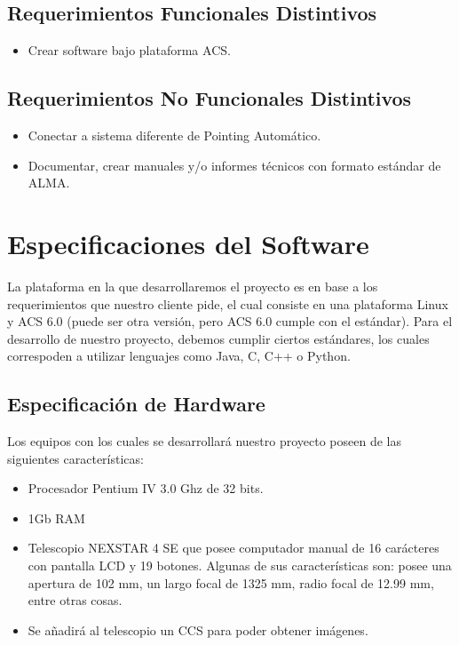 \documentclass[letterpaper,spanish,10pt]{article}
\begin{document}
\subsection{Requerimientos Funcionales Distintivos}
\begin{itemize}
	\item Crear software bajo plataforma ACS.
\end{itemize}

\subsection{Requerimientos No Funcionales Distintivos}
\begin{itemize}
	\item Conectar a sistema diferente de Pointing Automático.
	\item Documentar, crear manuales y/o informes t\'ecnicos con formato est\'andar de ALMA.
\end{itemize}


\newpage


\section{Especificaciones del Software}
La plataforma en la que desarrollaremos el proyecto es en base a los requerimientos que nuestro cliente pide, el cual consiste en una plataforma Linux y ACS 6.0 (puede ser otra versión, pero ACS 6.0 cumple con el estándar).
Para el desarrollo de nuestro proyecto, debemos cumplir ciertos estándares, los cuales correspoden a utilizar lenguajes como Java, C, C++ o Python.

\subsection{Especificación de Hardware}
Los equipos con los cuales se desarrollará nuestro proyecto poseen de las siguientes características:

\begin{itemize}
	\item Procesador Pentium IV 3.0 Ghz de 32 bits.
	\item 1Gb RAM
	\item Telescopio NEXSTAR 4 SE que posee computador manual de 16 carácteres con pantalla LCD y 19 botones. Algunas de sus características son: posee una apertura de 102 mm, un largo focal de 1325 mm, radio focal de 12.99 mm, entre otras cosas.
	\item Se añadirá al telescopio un CCS para poder obtener imágenes.
\end{itemize}
\end{document}
